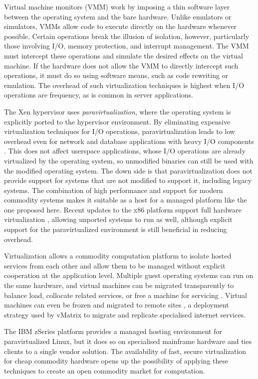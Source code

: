 Virtual machine monitors (VMM) work by imposing a thin software layer between the operating system and the bare hardware. Unlike emulators or simulators, VMMs allow code to execute directly on the hardware whenever possible. Certain operations break the illusion of isolation, however, particularly those involving I/O, memory protection, and interrupt management. The VMM must intercept these operations and simulate the desired effects on the virtual machine. If the hardware does not allow the VMM to directly intercept such operations, it must do so using software means, such as code rewriting or emulation. The overhead of such virtualization techniques is highest when I/O operations are frequency, as is common in server applications.

The Xen hypervisor uses \emph{paravirtualization}, where the operating system is explicitly ported to the hypervisor environment. By eliminating expensive virtualization techniques for I/O operations, paravirtualization leads to low overhead even for network and database applications with heavy I/O components \cite{barham}. This does not affect userspace applications, whose I/O operations are already virtualized by the operating system, so unmodified binaries can still be used with the modified operating system. The down side is that paravirtualization does not provide support for systems that are not modified to support it, including legacy systems. The combination of high performance and support for modern commodity systems makes it suitable as a host for a managed platform like the one proposed here. Recent updates to the x86 platform support full hardware virtualization \cite{adams}, allowing unported systems to run as well, although explicit support for the paravirtualized environment is still beneficial in reducing overhead.

Virtualization allows a commodity computation platform to isolate hosted services from each other and allow them to be managed without explicit cooperation at the application level. Multiple guest operating systems can run on the same hardware, and virtual machines can be migrated transparently to balance load, collocate related services, or free a machine for servicing \cite{clark}. Virtual machines can even be frozen and migrated to remote sites \cite{sapuntzakis02}, a deployment strategy used by vMatrix \cite{awadallah} to migrate and replicate specialised internet services.

The IBM zSeries \cite{ibmzseries} platform provides a managed hosting environment for paravirtualized Linux, but it does so on specialised mainframe hardware and ties clients to a single vendor solution. The availability of fast, secure virtualization for cheap commodity hardware opens up the possibility of applying these techniques to create an open commodity market for computation.

